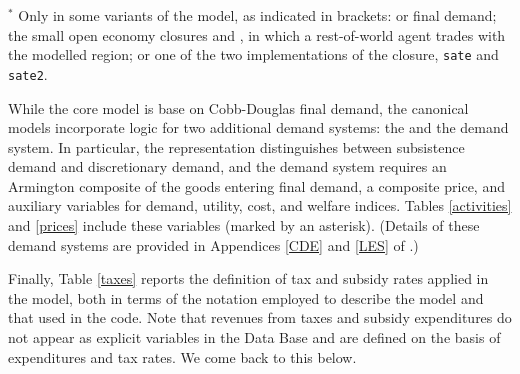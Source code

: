 \begin{table}[t!]
\begin{center}
\begin{tabular}{l>{\raggedright\arraybackslash}p{7.6cm}l}
\bottomrule
\end{tabular}
\par\smallskip
\begin{minipage}{\textwidth}\footnotesize
$^*$ Only in some variants of the model, as indicated in brackets:
\LES or \CDE final demand; the small open economy closures \SOE and \SATE, in which a rest-of-world agent trades with the modelled region; or one of the two implementations of the \SATE closure, \texttt{sate} and \texttt{sate2}.
\end{minipage}
\end{center}
\end{table}

While the core \GTAPINGAMS model is base on Cobb-Douglas final demand,
the canonical models incorporate logic for two additional demand
systems: the \LES and the \CDE demand system. In particular, the \LES
representation distinguishes between subsistence demand and
discretionary demand, and the \CDE demand system requires an Armington
composite of the goods entering final demand, a composite price, and
auxiliary variables for demand, utility, cost, and welfare indices.
Tables \ref{activities} and \ref{prices} include these variables
(marked by an asterisk).  (Details of these
demand systems are provided in Appendices \ref{CDE} and \ref{LES} of
\DOCU.)


Finally, Table \ref{taxes} reports the definition of tax and subsidy
rates applied in the model, both in terms of the notation employed to
describe the model and that used in the \GAMS code. Note that revenues
from taxes and subsidy expenditures do not appear as explicit
variables in the \GTAP Data Base and are defined on the basis of
expenditures and tax rates. We come back to this below.

